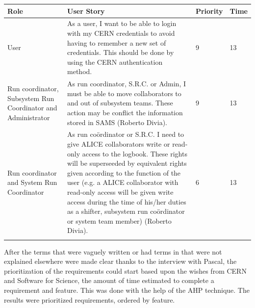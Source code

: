 \documentclass[paper=a4, fontsize=11pt,twoside]{scrartcl}	%
\begin{document}
\begin{longtable}{ | p{3cm} | p{8cm} | p{1.5cm} | l |}
\hline
Role & User Story & Priority & Time \\ \hline
User & As a user, I want to be able to login with my CERN credentials to avoid having to remember a new set of credentials. This should be done by using the CERN authentication method. & 9 & 13 \\ \hline
Run coordinator, Subsystem Run Coordinator and Administrator &  As run coordinator, S.R.C. or Admin, I must be able to move collaborators to and out of subsystem teams. These action may be conflict the information stored in SAMS (Roberto Divia). & 9 & 13 \\ \hline
Run coordinator and System Run Coordinator &  As run coördinator or S.R.C. I need to give ALICE collaborators write or read-only access to the logbook. These rights will be superseeded by equivalent rights given according to the function of the user (e.g. a ALICE collaborator with read-only access will be given write access during the time of his/her duties as a shifter, subsystem run coördinator or system team member) (Roberto Divia).&6&13 \\ \hline

\label{table:hans}
\end{longtable}

After the terms that were vaguely written or had terms in that were not explained elsewhere were made clear thanks to the interview with Pascal, the prioritization of the requirements could start based upon the wishes from CERN and Software for Science, the amount of time estimated to complete a requirement and feature. This was done with the help of the AHP technique. The results were prioritized requirements, ordered by feature. 
\newpage
\end{document}
